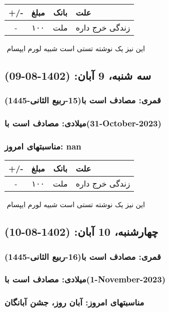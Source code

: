 \documentclass{article}
\newcommand{\rnote}[1]{\marginpar{\textcolor{color}{\StrSubstitute{\##1}{ }{\_}}}}
\newcommand{\myRow}[4]{
    #1 & #2 & #3 & #4 \\ \hline
}
\begin{document}
\begin{tabular}{ | c | c | c | p{5cm} |}
    \hline
    \myRow{ +/- }{مبلغ}{بانک}{علت}
    \myRow{-}{۱۰۰}{ملت}{زندگی خرج داره}
\end{tabular}
\newline
\newline

‌
\rnote{تست}
این نیز یک نوشته تستی است شبیه لورم ایپسام




\newpage
{}
\textcolor{color}{
\section{ سه شنبه، 9 آبان: (1402-08-09) }
\subsubsection*{قمری: مصادف است با(15-ربیع الثانی-1445)} 
\subsubsection*{میلادی: مصادف است با(31-October-2023)}
\subsubsection*{مناسبتهای امروز: nan}
}


\begin{tabular}{ | c | c | c | p{5cm} |}
    \hline
    \myRow{ +/- }{مبلغ}{بانک}{علت}
    \myRow{-}{۱۰۰}{ملت}{زندگی خرج داره}
\end{tabular}
\newline
\newline

‌
\rnote{تست}
این نیز یک نوشته تستی است شبیه لورم ایپسام




\newpage
{}
\textcolor{color}{
\section{ چهارشنبه، 10 آبان: (1402-08-10) }
\subsubsection*{قمری: مصادف است با(16-ربیع الثانی-1445)} 
\subsubsection*{میلادی: مصادف است با(1-November-2023)}
\subsubsection*{مناسبتهای امروز: آبان روز، جشن آبانگان}
}
\end{document}

